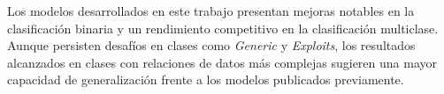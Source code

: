 Los modelos desarrollados en este trabajo presentan mejoras notables en la clasificación binaria y un rendimiento competitivo en la clasificación multiclase. Aunque persisten desafíos en clases como \textit{Generic} y \textit{Exploits}, los resultados alcanzados en clases con relaciones de datos más complejas sugieren una mayor capacidad de generalización frente a los modelos publicados previamente.